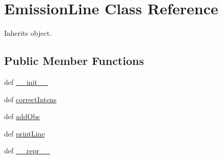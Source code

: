 \hypertarget{classpyneb_1_1core_1_1pynebcore_1_1_emission_line}{\section{Emission\-Line Class Reference}
\label{classpyneb_1_1core_1_1pynebcore_1_1_emission_line}
}


Inherits object.

\subsection*{Public Member Functions}
\begin{DoxyCompactItemize}
\item 
def \hyperlink{classpyneb_1_1core_1_1pynebcore_1_1_emission_line_ac775ee34451fdfa742b318538164070e}{\-\_\-\-\_\-init\-\_\-\-\_\-}
\item 
def \hyperlink{classpyneb_1_1core_1_1pynebcore_1_1_emission_line_a3385d0660407ddbdbc78b2ab44c9e25e}{correct\-Intens}
\item 
def \hyperlink{classpyneb_1_1core_1_1pynebcore_1_1_emission_line_ada122b7940c9876783a28ae85efb978b}{add\-Obs}
\item 
def \hyperlink{classpyneb_1_1core_1_1pynebcore_1_1_emission_line_a717eb09456c98e1729180223fe6b73ad}{print\-Line}
\item 
def \hyperlink{classpyneb_1_1core_1_1pynebcore_1_1_emission_line_ad8b9328939df072e4740cd9a63189744}{\-\_\-\-\_\-repr\-\_\-\-\_\-}
\end{DoxyCompactItemize}
